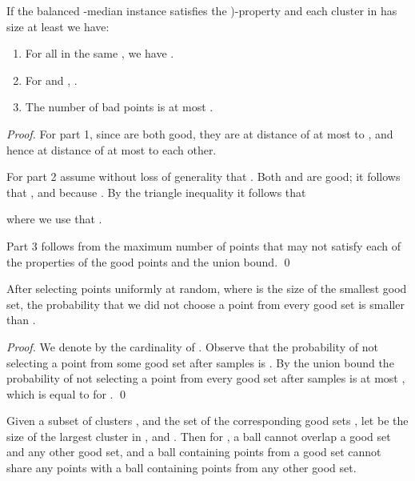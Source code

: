 \documentclass{llncs} \usepackage{algorithm}
\begin{document}
\begin{lemma}\label{lemma:structureBalancedKMedian}
If the balanced -median instance satisfies the )-property and each cluster in  has size at least  we have:
\begin{enumerate}
\item For all  in the same , we have .
\item For  and , .
\item The number of bad points is at most .
\end{enumerate}
\end{lemma}

\begin{proof}
For part 1, since  are both good, they are at distance of at most  to , and hence at distance of at most  to each other.

For part 2 assume without loss of generality that .  Both  and  are good; it follows that , and  because .  By the triangle inequality it follows that

where we use that .

Part 3 follows from the maximum number of points that may not satisfy each of the properties of the good points and the union bound. \qed
\end{proof}

\begin{lemma}\label{lemma:numberSamples}
After selecting  points uniformly at random, where  is the size of the smallest good set, the probability that we did not choose a point from every good set is smaller than .

\end{lemma}

\begin{proof}
We denote by  the cardinality of .  Observe that the probability of not selecting a point from some good set  after  samples is .  By the union bound the probability of not selecting a point from every good set after  samples is at most , which is equal to  for . \qed
\end{proof}



\begin{lemma}\label{lemma:noOverlap}
Given a subset of clusters , and the set of the corresponding good sets , let  be the size of the largest cluster in , and .  Then for , a ball cannot overlap a good set  and any other good set, and a ball containing points from a good set  cannot share any points with a ball containing points from any other good set.
\end{lemma}
\end{document}
